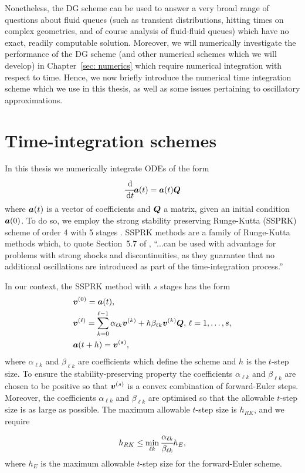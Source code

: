 Nonetheless, the DG scheme can be used to answer a very broad range of questions about fluid queues (such as transient distributions, hitting times on complex geometries, and of course analysis of fluid-fluid queues) which have no exact, readily computable solution. Moreover, we will numerically investigate the performance of the DG scheme (and other numerical schemes which we will develop) in Chapter~\ref{sec: numerics} which require numerical integration with respect to time. Hence, we now briefly introduce the numerical time integration scheme which we use in this thesis, as well as some issues pertaining to oscillatory approximations. 

\section{Time-integration schemes}\label{sec: time integration}
In this thesis we numerically integrate ODEs of the form
\begin{align}\label{eqn: DG ODE w BCs 3}
	\cfrac{\, \mathrm{d}}{\, \mathrm{d} t} \boldsymbol a(t)
	= \boldsymbol a(t) \boldsymbol Q
\end{align}
where \(\boldsymbol a(t)\) is a vector of coefficients and \(\boldsymbol Q\) a matrix, given an initial condition \(\boldsymbol a(0)\). To do so, we employ the strong stability preserving Runge-Kutta (SSPRK) scheme of order 4 with 5 stages \citep{sr2002}. SSPRK methods are a family of Runge-Kutta methods which, to quote Section~5.7 of \cite{nodalDGBook}, ``...can be used with advantage for problems with strong shocks and discontinuities, as they guarantee that no additional oscillations are introduced as part of the time-integration process.'' 

In our context, the SSPRK method with \(s\) stages has the form 
\begin{align*}
	&\boldsymbol v^{(0)} = \boldsymbol a(t),\\
	&\boldsymbol v^{(\ell)} = \sum_{k=0}^{\ell-1} \alpha_{\ell k}\boldsymbol v^{(k)} + h\beta_{\ell k}  \boldsymbol v^{(k)}\boldsymbol Q,\, \ell = 1,\dots,s,\\
	&\boldsymbol a(t+h) =\boldsymbol v^{(s)},
\end{align*}
where \(\alpha_{\ell k}\) and \(\beta_{\ell k}\) are coefficients which define the scheme and \(h\) is the \(t\)-step size. To ensure the stability-preserving property the coefficients \(\alpha_{\ell k}\) and \(\beta_{\ell k}\) are chosen to be positive so that \(\boldsymbol v^{(s)}\) is a convex combination of forward-Euler steps. Moreover, the coefficients \(\alpha_{\ell k}\) and \(\beta_{\ell k}\) are optimised so that the allowable \(t\)-step size is as large as possible. The maximum allowable \(t\)-step size is \(h_{RK}\), and we require 
\[h_{RK} \leq \min_{\ell k}\cfrac{\alpha_{\ell k}}{\beta_{\ell k}}h_E,\]
where \(h_E\) is the maximum allowable \(t\)-step size for the forward-Euler scheme. 

